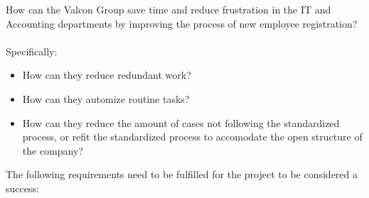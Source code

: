 \label{app:problem_statement}
How can the Valcon Group save time and reduce frustration in the IT and Accounting departments by improving the process of new employee registration?
\\\\
Specifically:
\begin{itemize}
\item How can they reduce redundant work?
\item How can they automize routine tasks?
\item How can they reduce the amount of cases not following the standardized process, or refit the standardized process to accomodate the open structure of the company?
\end{itemize}

The following requirements need to be fulfilled for the project to be considered a success:
